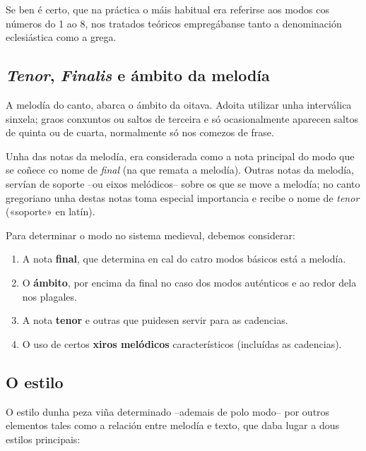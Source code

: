 \documentclass[a4paper, twoside]{templates/ociamthesis}
\providecommand{\tightlist}{%
  \setlength{\itemsep}{0pt}\setlength{\parskip}{0pt}}
\begin{document}
Se ben é certo, que na práctica o máis habitual era referirse aos modos cos números do 1 ao 8, nos tratados teóricos empregábanse tanto a denominación eclesiástica como a grega.

\hypertarget{tenor-finalis-e-uxe1mbito-da-meloduxeda}{%
\subsection{\texorpdfstring{\emph{Tenor}, \emph{Finalis} e ámbito da melodía}{Tenor, Finalis e ámbito da melodía}}\label{tenor-finalis-e-uxe1mbito-da-meloduxeda}}

A melodía do canto, abarca o ámbito da oitava. Adoita utilizar unha interválica sinxela; graos conxuntos ou saltos de terceira e só ocasionalmente aparecen saltos de quinta ou de cuarta, normalmente só nos comezos de frase.

Unha das notas da melodía, era considerada como a nota principal do modo que se coñece co nome de \emph{final} (na que remata a melodía). Outras notas da melodía, servían de soporte --ou eixos melódicos-- sobre os que se move a melodía; no canto gregoriano unha destas notas toma especial importancia e recibe o nome de \emph{tenor} («soporte» en latín).

Para determinar o modo no sistema medieval, debemos considerar:

\begin{enumerate}
\def\labelenumi{\arabic{enumi}.}
\tightlist
\item
  A nota \textbf{final}, que determina en cal do catro modos básicos está a melodía.
\item
  O \textbf{ámbito}, por encima da final no caso dos modos auténticos e ao redor dela nos plagales.
\item
  A nota \textbf{tenor} e outras que puidesen servir para as cadencias.
\item
  O uso de certos \textbf{xiros melódicos} característicos (incluídas as cadencias).
\end{enumerate}

\hypertarget{o-estilo}{%
\subsection{O estilo}\label{o-estilo}}

O estilo dunha peza viña determinado --ademais de polo modo-- por outros elementos tales como a relación entre melodía e texto, que daba lugar a dous estilos principais:
\end{document}
